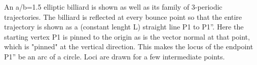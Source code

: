 An a/b=1.5 elliptic billiard is shown as well as its family of 3-periodic trajectories. The billiard is reflected at every bounce point so that the entire trajectory is shown as a (constant lenght L) straight line P1 to P1''. Here the starting vertex P1 is pinned to the origin as is the vector normal at that point, which is "pinned" at the vertical direction. This makes the locus of the endpoint P1'' be an arc of a circle. Loci are drawn for a few intermediate points.